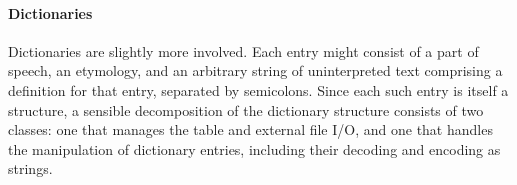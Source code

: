 
\paragraph{Dictionaries}
Dictionaries are slightly more involved. Each entry might consist of a
part of speech, an etymology, and an arbitrary string of uninterpreted
text comprising a definition for that entry, separated by semicolons.
Since each such entry is itself a structure, a sensible decomposition
of the dictionary structure consists of two classes: one that manages
the table and external file I/O, and one that handles the manipulation
of dictionary entries, including their decoding and encoding as
strings. 


